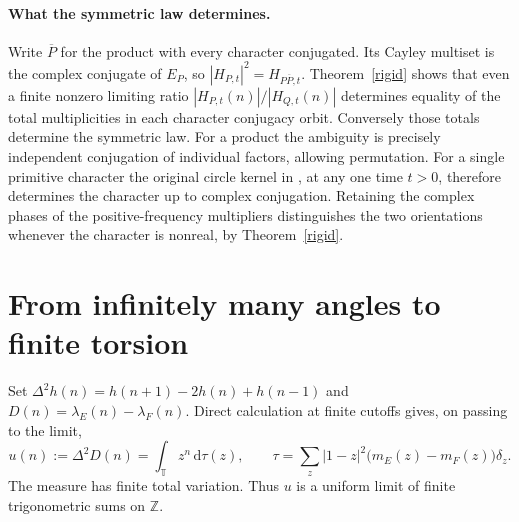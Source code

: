 \documentclass[11pt]{article}
\newcommand{\T}{\mathbb T}
\newcommand{\Z}{\mathbb Z}
\newcommand{\dd}{\mathrm d}
\begin{document}
\paragraph{What the symmetric law determines.}
Write $\overline P$ for the product with every character conjugated.
Its Cayley multiset is the complex conjugate of $E_P$, so
$|H_{P,t}|^2=H_{P\overline P,t}$. Theorem~\ref{rigid} shows that even a
finite nonzero limiting ratio $|H_{P,t}(n)|/|H_{Q,t}(n)|$ determines
equality of the total multiplicities in each character conjugacy orbit.
Conversely those totals determine the symmetric law. For a product the
ambiguity is precisely independent conjugation of individual factors,
allowing permutation. For a single primitive character the original
circle kernel in \cite{article}, at any one time $t>0$, therefore
determines the character up to complex conjugation. Retaining the
complex phases of the positive-frequency multipliers distinguishes the
two orientations whenever the character is nonreal, by Theorem~\ref{rigid}.

\section{From infinitely many angles to finite torsion}

Set $\Delta^2h(n)=h(n+1)-2h(n)+h(n-1)$ and
$D(n)=\lambda_E(n)-\lambda_F(n)$. Direct calculation at finite cutoffs
gives, on passing to the limit,
\begin{equation}
 u(n):=\Delta^2D(n)=\int_{\T}z^n\,\dd\tau(z),\qquad
 \tau=\sum_z |1-z|^2\big(m_E(z)-m_F(z)\big)\delta_z . \label{diff}
\end{equation}
The measure has finite total variation. Thus $u$ is a uniform limit of finite
trigonometric sums on $\Z$.
\end{document}
